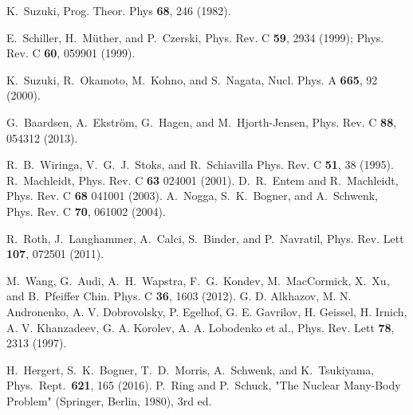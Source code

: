 \documentclass[aps,prc, dvips, twocolumn,groupedaddress,showkeys,showpacs,floatfix,superscriptaddress]{revtex4-1}
\newcommand{\<}{\langle}
\renewcommand{\>}{\rangle}
\begin{document}
\begin{thebibliography}{99}
	 K.~Suzuki, Prog. Theor. Phys {\bf 68}, 246 (1982).

  E.~Schiller, H.~M\"uther, and P.~Czerski,
  Phys. Rev. C {\bf 59}, 2934 (1999);
Phys. Rev. C {\bf 60}, 059901 (1999).

  K.~Suzuki, R.~Okamoto, M.~Kohno, and S.~Nagata,
  Nucl. Phys. A {\bf 665}, 92 (2000).

  G.~Baardsen, A.~Ekstr\"om, G.~Hagen, and M.~Hjorth-Jensen,
  Phys. Rev. C {\bf 88}, 054312 (2013).


        R.~B.~Wiringa, V.~G.~J.~Stoks, and R.~Schiavilla
        Phys. Rev. C {\bf 51}, 38 (1995).
   R.~Machleidt, Phys. Rev. C {\bf 63} 024001 (2001).
   D.~R.~Entem and R.~Machleidt, Phys. Rev. C {\bf 68} 041001 (2003).
  A.~Nogga, S.~K.~Bogner, and A.~Schwenk, Phys. Rev. C {\bf 70}, 061002 (2004).

R.~Roth, J.~Langhammer, A.~Calci, S.~Binder, and P.~Navratil,
Phys. Rev. Lett {\bf 107}, 072501 (2011).

	M.~Wang, G.~Audi, A.~H.~Wapstra, F.~G.~Kondev, M.~MacCormick,
	X.~Xu, and B.~Pfeiffer
	Chin. Phys. C {\bf 36}, 1603 (2012).
  G. D. Alkhazov, M. N. Andronenko, A. V. Dobrovolsky, P. Egelhof, G. E. Gavrilov, H. Geissel, H. Irnich, A. V. Khanzadeev, G. A. Korolev, A. A. Lobodenko et al.,
  Phys. Rev. Lett {\bf 78}, 2313 (1997).


H.~Hergert, S.~K.~Bogner, T.~D.~Morris, A.~Schwenk, and K.~Tsukiyama,
Phys.\ Rept.\ {\bf 621}, 165 (2016).
  P.~Ring and P.~Schuck, "The Nuclear Many-Body Problem" (Springer, Berlin, 1980), 3rd ed.

\end{thebibliography}
\end{document}
